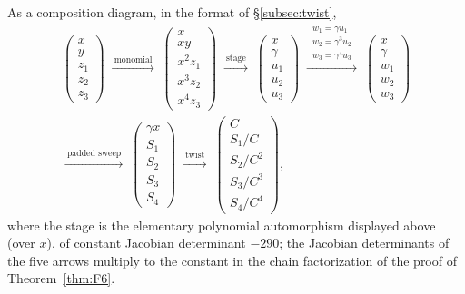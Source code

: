 \documentclass[11pt]{article}
\theoremstyle{plain}
\theoremstyle{definition}
\theoremstyle{remark}
\begin{document}
As a composition diagram, in the format of \S\ref{subsec:twist},
\begin{multline*}
\begin{pmatrix}x\\ y\\ z_1\\ z_2\\ z_3\end{pmatrix}
\;\xrightarrow{\ \text{monomial}\ }\;
\begin{pmatrix}x\\ xy\\ x^2z_1\\ x^3z_2\\ x^4z_3\end{pmatrix}
\;\xrightarrow{\ \text{stage}\ }\;
\begin{pmatrix}x\\ \gamma\\ u_1\\ u_2\\ u_3\end{pmatrix}
\;\xrightarrow{\ \substack{w_1=\gamma u_1\\[1pt] w_2=\gamma^3u_2\\[1pt] w_3=\gamma^4u_3}\ }\;
\begin{pmatrix}x\\ \gamma\\ w_1\\ w_2\\ w_3\end{pmatrix}\\
\xrightarrow{\ \text{padded sweep}\ }\;
\begin{pmatrix}\gamma x\\ S_1\\ S_2\\ S_3\\ S_4\end{pmatrix}
\;\xrightarrow{\ \text{twist}\ }\;
\begin{pmatrix}C\\ S_1/C\\ S_2/C^2\\ S_3/C^3\\ S_4/C^4\end{pmatrix},
\end{multline*}
where the stage is the elementary polynomial automorphism displayed above
(over $x$), of constant Jacobian determinant $-290$; the Jacobian determinants
of the five arrows multiply to the constant in the chain factorization of the
proof of Theorem~\ref{thm:F6}.
\end{document}
